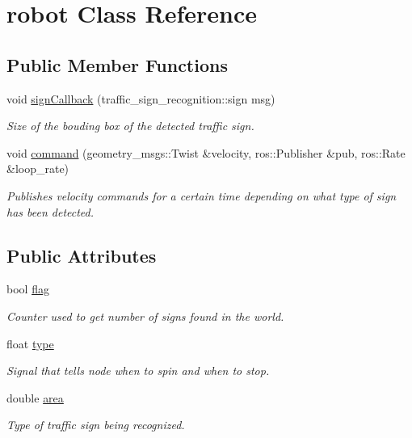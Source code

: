 \hypertarget{classrobot}{}\section{robot Class Reference}
\label{classrobot}
\subsection*{Public Member Functions}
\begin{DoxyCompactItemize}
\item 
void \hyperlink{classrobot_ae75398439047ff01b4862f94f024e1bd}{sign\+Callback} (traffic\+\_\+sign\+\_\+recognition\+::sign msg)
\begin{DoxyCompactList}\small\item\em Size of the bouding box of the detected traffic sign. \end{DoxyCompactList}\item 
void \hyperlink{classrobot_af8555fa2112c06bf201122bfe2a9e290}{command} (geometry\+\_\+msgs\+::\+Twist \&velocity, ros\+::\+Publisher \&pub, ros\+::\+Rate \&loop\+\_\+rate)
\begin{DoxyCompactList}\small\item\em Publishes velocity commands for a certain time depending on what type of sign has been detected. \end{DoxyCompactList}\end{DoxyCompactItemize}
\subsection*{Public Attributes}
\begin{DoxyCompactItemize}
\item 
bool \hyperlink{classrobot_a05155d037030c16510607ef4efb69cfb}{flag}\hypertarget{classrobot_a05155d037030c16510607ef4efb69cfb}{}\label{classrobot_a05155d037030c16510607ef4efb69cfb}

\begin{DoxyCompactList}\small\item\em Counter used to get number of signs found in the world. \end{DoxyCompactList}\item 
float \hyperlink{classrobot_a187cfd9e3acf8fa728d667aada0c9fa9}{type}\hypertarget{classrobot_a187cfd9e3acf8fa728d667aada0c9fa9}{}\label{classrobot_a187cfd9e3acf8fa728d667aada0c9fa9}

\begin{DoxyCompactList}\small\item\em Signal that tells node when to spin and when to stop. \end{DoxyCompactList}\item 
double \hyperlink{classrobot_a45ef84659871b1b8a252a8d8a849f256}{area}\hypertarget{classrobot_a45ef84659871b1b8a252a8d8a849f256}{}\label{classrobot_a45ef84659871b1b8a252a8d8a849f256}

\begin{DoxyCompactList}\small\item\em Type of traffic sign being recognized. \end{DoxyCompactList}\end{DoxyCompactItemize}


